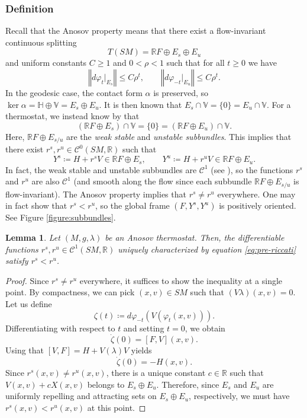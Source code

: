 \documentclass[reqno,12pt,letterpaper]{amsart}
\newtheorem{lemma}[proposition]{Lemma}
\theoremstyle{definition}
\theoremstyle{remark}
\theoremstyle{definition}
\numberwithin{equation}{section}
\newcommand{\R}{\mathbb{R}}
\begin{document}
\subsubsection{Definition} Recall that the Anosov property means that there exist a flow-invariant continuous splitting 
$$T(SM)=\R F \oplus E_s\oplus E_u$$
and uniform constants $C\geq 1$ and $0<\rho<1$ such that for all $t\geq 0$ we have
\begin{equation}\label{eq:hyperbolic-estimates}
\left\Vert d\varphi_{t}|_{E_s}\right\Vert \leq C\rho^t, \qquad\left\Vert d\varphi_{-t}|_{E_u}\right\Vert \leq C\rho^t.
\end{equation}
In the geodesic case, the contact form $\alpha$ is preserved, so $\ker \alpha =\mathbb{H}\oplus \mathbb{V}= E_s \oplus E_u$. It is then known that $E_s\cap \mathbb{V}=\{0\}=E_u\cap \mathbb{V}$. For a thermostat, we instead know by \cite[Lemma 4.1]{dairbekov07} that
\begin{equation}\label{eq:transversality}
(\R F\oplus E_s)\cap \mathbb{V}=\{0\}=(\R F\oplus E_u)\cap \mathbb{V}.
\end{equation}
Here, $\R F\oplus E_{s/u}$ are the \textit{weak stable} and \textit{unstable subbundles}. This implies that there exist $r^{s}, r^u\in \mathcal{C}^0(SM,\R)$ such that
\begin{equation}\label{eq:pre-riccati}
Y^s\coloneqq H+r^sV\in \R F\oplus E_s, \qquad Y^u\coloneqq H+r^uV\in \R F\oplus E_u.
\end{equation}
In fact, the weak stable and unstable subbundles are $\mathcal{C}^1$ (see \cite[Corollary 1.8]{hasselblatt94}), so the functions $r^{s}$ and $r^u$ are also $\mathcal{C}^1$ (and smooth along the flow since each subbundle $\R F\oplus E_{s/u}$ is flow-invariant).  The Anosov property implies that $r^s\neq r^u$ everywhere. One may in fact show that $r^s<r^u$, so the global frame $(F, Y^s, Y^u)$ is positively oriented. See Figure \ref{figure:subbundles}. 

\begin{lemma}
Let $(M, g, \lambda)$ be an Anosov thermostat. Then, the differentiable functions $r^{s}, r^u \in \mathcal{C}^1(SM, \R)$ uniquely characterized by equation \eqref{eq:pre-riccati} satisfy $r^s<r^u$.
\end{lemma}
\begin{proof}
Since $r^s\neq r^u$ everywhere, it suffices to show the inequality at a single point. By compactness, we can pick $(x,v)\in SM$ such that $(V\lambda)(x,v)=0$. Let us define
$$\zeta(t)\coloneqq d\varphi_{-t}(V(\varphi_t(x,v))).$$
Differentiating with respect to $t$ and setting $t=0$, we obtain 
$$\dot{\zeta}(0)=[F,V](x,v).$$
Using that $[V, F]=H+V(\lambda)V$ yields
$$\dot{\zeta}(0)=-H(x,v).$$
Since $r^{s}(x,v)\neq r^{u}(x,v)$, there is a unique constant $c\in \R$ such that $V(x,v)+cX(x,v)$ belongs to $E_s\oplus E_u$. Therefore, since $E_s$ and $E_u$ are uniformly repelling and attracting sets on $E_s\oplus E_u$, respectively, we must have $r^s(x,v)<r^u(x,v)$ at this point.
\end{proof}
\end{document}
